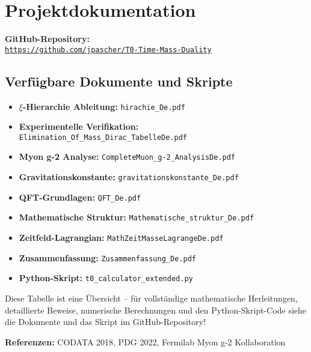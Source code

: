 \documentclass[12pt,a4paper]{article}
\begin{document}
	\section{Projektdokumentation}
	\textbf{GitHub-Repository:}\\
	\texttt{\url{https://github.com/jpascher/T0-Time-Mass-Duality}}
	
	\subsection{Verfügbare Dokumente und Skripte}
	\begin{itemize}
		\item \textbf{$\xi$-Hierarchie Ableitung:} \texttt{hirachie\_De.pdf}
		\item \textbf{Experimentelle Verifikation:} \texttt{Elimination\_Of\_Mass\_Dirac\_TabelleDe.pdf}
		\item \textbf{Myon g-2 Analyse:} \texttt{CompleteMuon\_g-2\_AnalysisDe.pdf}
		\item \textbf{Gravitationskonstante:} \texttt{gravitationskonstante\_De.pdf}
		\item \textbf{QFT-Grundlagen:} \texttt{QFT\_De.pdf}
		\item \textbf{Mathematische Struktur:} \texttt{Mathematische\_struktur\_De.pdf}
		\item \textbf{Zeitfeld-Lagrangian:} \texttt{MathZeitMasseLagrangeDe.pdf}
		\item \textbf{Zusammenfassung:} \texttt{Zusammenfassung\_De.pdf}
		\item \textbf{Python-Skript:} \texttt{t0\_calculator\_extended.py}
	\end{itemize}
	
	Diese Tabelle ist eine Übersicht – für vollständige mathematische Herleitungen, detaillierte Beweise, numerische Berechnungen und den Python-Skript-Code siehe die Dokumente und das Skript im GitHub-Repository!
	
	\textbf{Referenzen:} CODATA 2018, PDG 2022, Fermilab Myon g-2 Kollaboration
	
\end{document}
